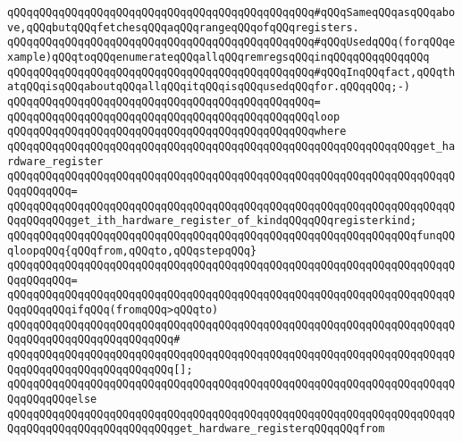 \verb|qQQqqQQqqQQqqQQqqQQqqQQqqQQqqQQqqQQqqQQqqQQqqQQq#qQQqSameqQQqasqQQqabove,qQQqbutqQQqfetchesqQQqaqQQqrangeqQQqofqQQqregisters.|\newline
\verb|qQQqqQQqqQQqqQQqqQQqqQQqqQQqqQQqqQQqqQQqqQQqqQQq#qQQqUsedqQQq(forqQQqexample)qQQqtoqQQqenumerateqQQqallqQQqremregsqQQqinqQQqqQQqqQQqqQQq|\newline
\verb|qQQqqQQqqQQqqQQqqQQqqQQqqQQqqQQqqQQqqQQqqQQqqQQq#qQQqInqQQqfact,qQQqthatqQQqisqQQqaboutqQQqallqQQqitqQQqisqQQqusedqQQqfor.qQQqqQQq;-)|\newline
\verb|qQQqqQQqqQQqqQQqqQQqqQQqqQQqqQQqqQQqqQQqqQQqqQQq=|\newline
\verb|qQQqqQQqqQQqqQQqqQQqqQQqqQQqqQQqqQQqqQQqqQQqqQQqloop|\newline
\verb|qQQqqQQqqQQqqQQqqQQqqQQqqQQqqQQqqQQqqQQqqQQqqQQqwhere|\newline
\verb|qQQqqQQqqQQqqQQqqQQqqQQqqQQqqQQqqQQqqQQqqQQqqQQqqQQqqQQqqQQqqQQqget_hardware_register|\newline
\verb|qQQqqQQqqQQqqQQqqQQqqQQqqQQqqQQqqQQqqQQqqQQqqQQqqQQqqQQqqQQqqQQqqQQqqQQqqQQqqQQq=|\newline
\verb|qQQqqQQqqQQqqQQqqQQqqQQqqQQqqQQqqQQqqQQqqQQqqQQqqQQqqQQqqQQqqQQqqQQqqQQqqQQqqQQqget_ith_hardware_register_of_kindqQQqqQQqregisterkind;|\newline
\newline
\verb|qQQqqQQqqQQqqQQqqQQqqQQqqQQqqQQqqQQqqQQqqQQqqQQqqQQqqQQqqQQqqQQqfunqQQqloopqQQq{qQQqfrom,qQQqto,qQQqstepqQQq}|\newline
\verb|qQQqqQQqqQQqqQQqqQQqqQQqqQQqqQQqqQQqqQQqqQQqqQQqqQQqqQQqqQQqqQQqqQQqqQQqqQQqqQQq=|\newline
\verb|qQQqqQQqqQQqqQQqqQQqqQQqqQQqqQQqqQQqqQQqqQQqqQQqqQQqqQQqqQQqqQQqqQQqqQQqqQQqqQQqifqQQq(fromqQQq>qQQqto)|\newline
\verb|qQQqqQQqqQQqqQQqqQQqqQQqqQQqqQQqqQQqqQQqqQQqqQQqqQQqqQQqqQQqqQQqqQQqqQQqqQQqqQQqqQQqqQQqqQQqqQQq#|\newline
\verb|qQQqqQQqqQQqqQQqqQQqqQQqqQQqqQQqqQQqqQQqqQQqqQQqqQQqqQQqqQQqqQQqqQQqqQQqqQQqqQQqqQQqqQQqqQQqqQQq[];|\newline
\verb|qQQqqQQqqQQqqQQqqQQqqQQqqQQqqQQqqQQqqQQqqQQqqQQqqQQqqQQqqQQqqQQqqQQqqQQqqQQqqQQqelse|\newline
\verb|qQQqqQQqqQQqqQQqqQQqqQQqqQQqqQQqqQQqqQQqqQQqqQQqqQQqqQQqqQQqqQQqqQQqqQQqqQQqqQQqqQQqqQQqqQQqqQQqget_hardware_registerqQQqqQQqfrom|\newline
